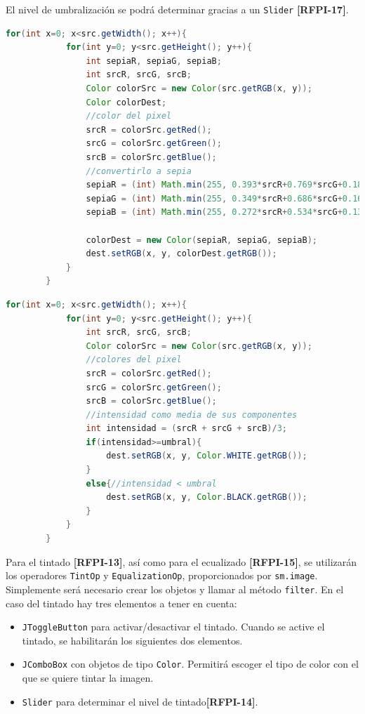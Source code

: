 \vskip0.3cm
El nivel de umbralización se podrá determinar gracias a un \texttt{Slider} \textbf{[RFPI-17]}. 
\begin{lstlisting}[language=Java, caption=Filtro sepia, label=lst:graddesc]
		for(int x=0; x<src.getWidth(); x++){
            for(int y=0; y<src.getHeight(); y++){
                int sepiaR, sepiaG, sepiaB;
                int srcR, srcG, srcB;
                Color colorSrc = new Color(src.getRGB(x, y));
                Color colorDest;
                //color del pixel
                srcR = colorSrc.getRed();
                srcG = colorSrc.getGreen();
                srcB = colorSrc.getBlue();
                //convertirlo a sepia
                sepiaR = (int) Math.min(255, 0.393*srcR+0.769*srcG+0.189*srcB);
                sepiaG = (int) Math.min(255, 0.349*srcR+0.686*srcG+0.168*srcB);
                sepiaB = (int) Math.min(255, 0.272*srcR+0.534*srcG+0.131*srcB);
                
                colorDest = new Color(sepiaR, sepiaG, sepiaB);
                dest.setRGB(x, y, colorDest.getRGB());
            }
        }
\end{lstlisting}
\begin{lstlisting}[language=Java, caption=Filtro umbralización, label=lst:graddesc]
		for(int x=0; x<src.getWidth(); x++){
            for(int y=0; y<src.getHeight(); y++){
                int srcR, srcG, srcB;
                Color colorSrc = new Color(src.getRGB(x, y));
                //colores del pixel
                srcR = colorSrc.getRed();
                srcG = colorSrc.getGreen();
                srcB = colorSrc.getBlue();
                //intensidad como media de sus componentes
                int intensidad = (srcR + srcG + srcB)/3;
                if(intensidad>=umbral){
                    dest.setRGB(x, y, Color.WHITE.getRGB());
                }
                else{//intensidad < umbral
                    dest.setRGB(x, y, Color.BLACK.getRGB());
                }
            }
        }
\end{lstlisting}
\vskip0.3cm 
Para el tintado \textbf{[RFPI-13]}, así como para el ecualizado \textbf{[RFPI-15]}, se utilizarán los operadores \texttt{TintOp} y \texttt{EqualizationOp}, proporcionados por \texttt{sm.image}. Simplemente será necesario crear los objetos y llamar al método \texttt{filter}. En el caso del tintado hay tres elementos a tener en cuenta:
\begin{itemize}
\item{\texttt{JToggleButton} para activar/desactivar el tintado. Cuando se active el tintado, se habilitarán los siguientes dos elementos.}
\item{\texttt{JComboBox} con objetos de tipo \texttt{Color}. Permitirá escoger el tipo de color con el que se quiere tintar la imagen.}
\item{\texttt{Slider} para determinar el nivel de tintado\textbf{[RFPI-14]}.}
\end{itemize}
